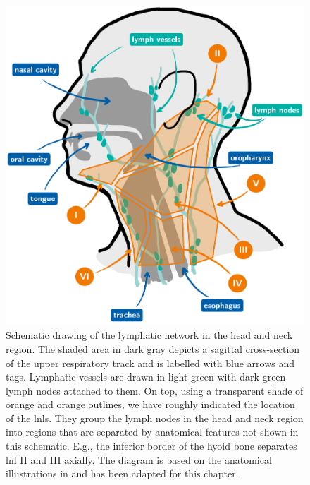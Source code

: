 \documentclass[\relativeRoot/main.tex]{subfiles}
\begin{document}
\begin{figure}
    \centering
    \includegraphics[width=\textwidth]{figures/head_and_neck_labelled.png}
    \caption[
        Schematic drawing of the head and neck region.
    ]{
        Schematic drawing of the lymphatic network in the head and neck region. The shaded area in dark gray depicts a sagittal cross-section of the upper respiratory track and is labelled with blue arrows and tags. Lymphatic vessels are drawn in light green with dark green lymph nodes attached to them. On top, using a transparent shade of orange and orange outlines, we have roughly indicated the location of the \glspl{lnl}. They group the lymph nodes in the head and neck region into regions that are separated by anatomical features not shown in this schematic. E.g., the inferior border of the hyoid bone separates \gls{lnl} II and III axially. The diagram is based on the anatomical illustrations in  and has been adapted for this chapter.
    }
    \label{fig:intro:schematics_head}
\end{figure}
\end{document}
